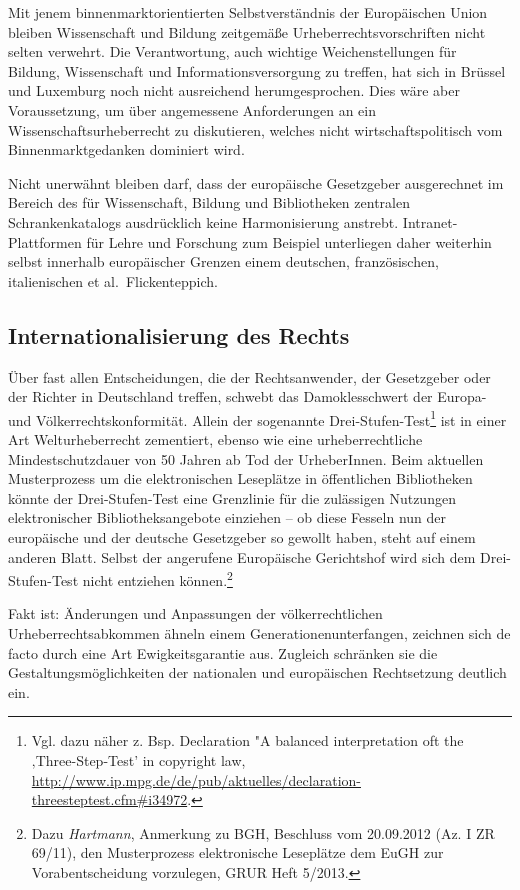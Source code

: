 \documentclass[output=paper]{langscibook}
\begin{document}
Mit jenem binnenmarktorientierten Selbstverständnis der Europäischen
Union bleiben Wissenschaft und Bildung zeitgemäße
Urheberrechtsvorschriften nicht selten verwehrt. Die Verantwortung, auch
wichtige Weichenstellungen für Bildung, Wissenschaft und
Informationsversorgung zu treffen, hat sich in Brüssel und Luxemburg
noch nicht ausreichend herumgesprochen. Dies wäre aber Voraussetzung, um
über angemessene Anforderungen an ein Wissenschaftsurheberrecht zu
diskutieren, welches nicht wirtschaftspolitisch vom Binnenmarktgedanken
dominiert wird.

Nicht unerwähnt bleiben darf, dass der europäische Gesetzgeber
ausgerechnet im Bereich des für Wissenschaft, Bildung und Bibliotheken
zentralen Schrankenkatalogs ausdrücklich keine Harmonisierung anstrebt.
Intranet-Plattformen für Lehre und Forschung zum Beispiel unterliegen
daher weiterhin selbst innerhalb europäischer Grenzen einem deutschen,
französischen, italienischen et al.~Flickenteppich.

\hypertarget{internationalisierung-des-rechts}{%
\subsection{Internationalisierung des
Rechts}\label{internationalisierung-des-rechts}}

Über fast allen Entscheidungen, die der Rechtsanwender, der Gesetzgeber
oder der Richter in Deutschland treffen, schwebt das Damoklesschwert der
Europa- und Völkerrechtskonformität. Allein der sogenannte
Drei-Stufen-Test\footnote{Vgl. dazu näher z. Bsp. Declaration "A
  balanced interpretation oft the ‚Three-Step-Test' in copyright law,
  \url{http://www.ip.mpg.de/de/pub/aktuelles/declaration-threesteptest.cfm\#i34972}.}
ist in einer Art Welturheberrecht zementiert, ebenso wie eine
urheberrechtliche Mindestschutzdauer von 50 Jahren ab Tod der
UrheberInnen. Beim aktuellen Musterprozess um die elektronischen
Leseplätze in öffentlichen Bibliotheken könnte der Drei-Stufen-Test eine
Grenzlinie für die zulässigen Nutzungen elektronischer
Bibliotheksangebote einziehen -- ob diese Fesseln nun der europäische
und der deutsche Gesetzgeber so gewollt haben, steht auf einem anderen
Blatt. Selbst der angerufene Europäische Gerichtshof wird sich dem
Drei-Stufen-Test nicht entziehen können.\footnote{Dazu \emph{Hartmann},
  Anmerkung zu BGH, Beschluss vom 20.09.2012 (Az. I ZR 69/11), den
  Musterprozess elektronische Leseplätze dem EuGH zur Vorabentscheidung
  vorzulegen, GRUR Heft 5/2013.}

Fakt ist: Änderungen und Anpassungen der völkerrechtlichen
Urheberrechtsabkommen ähneln einem Generationenunterfangen, zeichnen
sich de facto durch eine Art Ewigkeitsgarantie aus. Zugleich schränken
sie die Gestaltungsmöglichkeiten der nationalen und europäischen
Rechtsetzung deutlich ein.
\end{document}

